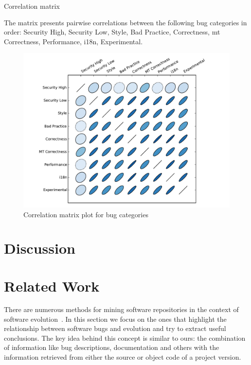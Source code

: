 \documentclass[conference]{llncs}
\begin{document}
\begin{table}
    \centering
    \caption{Correlation matrix}
    \label{tbl:corrmatrix}
    
    \small The matrix presents pairwise correlations between the
        following bug categories in order: Security High, Security
        Low, Style, Bad Practice, Correctness, {\sc mt} Correctness,
        Performance, i18n, Experimental.
\end{table}


\begin{figure}
  \centering
  \includegraphics[scale=0.6]{corrplot.pdf}
  \caption{Correlation matrix plot for bug categories}
  \label{fig:corrplot}
\end{figure}

\section{Discussion}
\label{sec:dis}

\section{Related Work}
\label{sec:rel}

There are numerous methods for mining software repositories in the context
of software evolution~\cite{KCM07}. In this section we focus on the ones
that highlight the relationship between software bugs and evolution and try to
extract useful conclusions. The key idea behind this concept is
similar to ours: the combination of information like bug descriptions,
documentation and others with the information retrieved from either the source
or object code of a project version.
\end{document}
